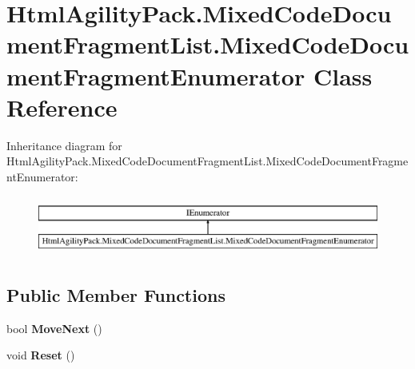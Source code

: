 \hypertarget{class_html_agility_pack_1_1_mixed_code_document_fragment_list_1_1_mixed_code_document_fragment_enumerator}{}\section{Html\+Agility\+Pack.\+Mixed\+Code\+Document\+Fragment\+List.\+Mixed\+Code\+Document\+Fragment\+Enumerator Class Reference}
\label{class_html_agility_pack_1_1_mixed_code_document_fragment_list_1_1_mixed_code_document_fragment_enumerator}
Inheritance diagram for Html\+Agility\+Pack.\+Mixed\+Code\+Document\+Fragment\+List.\+Mixed\+Code\+Document\+Fragment\+Enumerator\+:\begin{figure}[H]
\begin{center}
\leavevmode
\includegraphics[height=2.000000cm]{class_html_agility_pack_1_1_mixed_code_document_fragment_list_1_1_mixed_code_document_fragment_enumerator}
\end{center}
\end{figure}
\subsection*{Public Member Functions}
\begin{DoxyCompactItemize}
\item 
\mbox{\label{class_html_agility_pack_1_1_mixed_code_document_fragment_list_1_1_mixed_code_document_fragment_enumerator_ad7ffaba8b471800e5f02bb057f2c9984}} 
bool {\bfseries Move\+Next} ()
\item 
\mbox{\label{class_html_agility_pack_1_1_mixed_code_document_fragment_list_1_1_mixed_code_document_fragment_enumerator_a400b661bff2f0037e040fb050400047d}} 
void {\bfseries Reset} ()
\end{DoxyCompactItemize}
